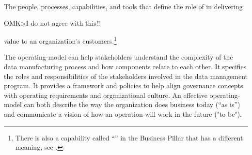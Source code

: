 %
%
The people, processes, capabilities, and tools that define the role of  in delivering

OMK>I do not agree with this!!


value to an organization’s customers.\footnote{%
    There is also a capability called ``'' in the
    Business Pillar that has a different meaning, see .
}

The \gls{operating-model} can help stakeholders understand the complexity of the data manufacturing process and how
components relate to each other.
It specifies the roles and responsibilities of the stakeholders involved in the data management program.
It provides a framework and policies to help align governance concepts with operating requirements and
organizational culture.
An effective \gls{operating-model} can both describe the way the organization does business today (“as is”) and
communicate a vision of how an operation will work in the future ("to be").

